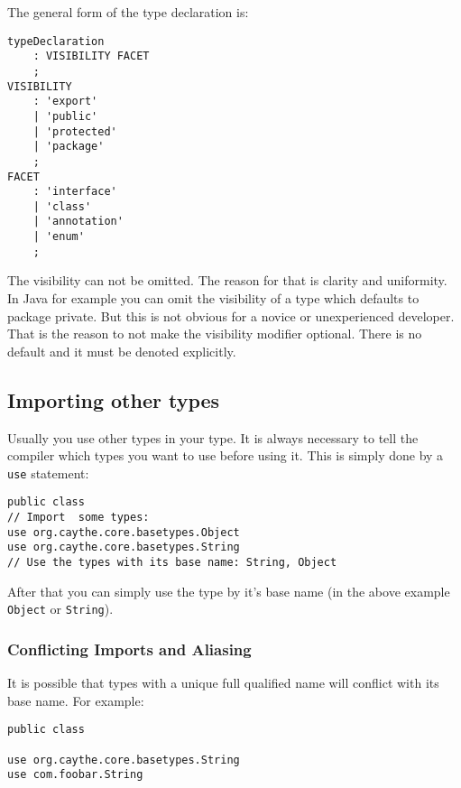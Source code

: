 \documentclass[11pt,a4paper]{report}
\begin{document}
The general form of the type declaration is:

\begin{lstlisting}[title=Grammar for type declaration]
typeDeclaration
    : VISIBILITY FACET
    ;
VISIBILITY 
    : 'export'
    | 'public'
    | 'protected'
    | 'package'
    ;
FACET
    : 'interface'
    | 'class'
    | 'annotation'
    | 'enum'
    ;
\end{lstlisting}

The visibility can not be omitted. The reason for that is clarity and uniformity. In Java for example you can omit the visibility of a type which defaults to package private. But this is not obvious for a novice or unexperienced developer. That is the reason to not make the visibility modifier optional. There is no default and it must be denoted explicitly.

\subsection{Importing other types}

Usually you use other types in your type. It is always necessary to tell the compiler which types you want to use before using it. This is simply done by a \texttt{use} statement:

\begin{lstlisting}[language=CayThe, title=Module source file foo/bar/Baz.ct]
public class 
// Import  some types:
use org.caythe.core.basetypes.Object
use org.caythe.core.basetypes.String
// Use the types with its base name: String, Object
\end{lstlisting}

After that you can simply use the type by it's base name (in the above example \texttt{Object} or \texttt{String}).

\subsubsection{Conflicting Imports and Aliasing}

It is possible that types with a unique full qualified name will conflict with its base name. For example:

\begin{lstlisting}[language=CayThe, title=Module source file foo/bar/Baz.ct]
public class 

use org.caythe.core.basetypes.String
use com.foobar.String
\end{lstlisting}
\end{document}
